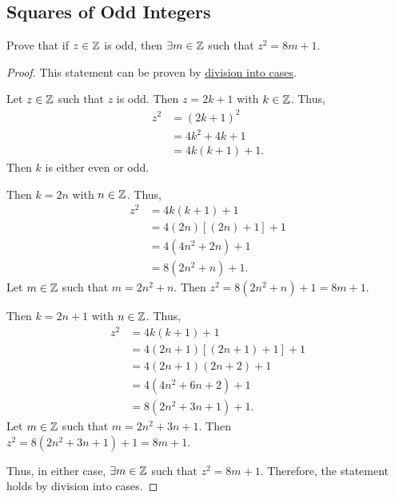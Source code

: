 \subsection{Squares of Odd Integers}
\label{subsections:examples:example1}



\begin{exercise}{
    Prove that if $z \in \mathbb{Z}$ is odd, %
    then $\exists m \in \mathbb{Z}$ such that $z^2 = 8m + 1$.
}
\end{exercise}



\begin{proof}{
    This statement can be proven by %
    \hyperref[subsections:techniques:universal:cases]{division into cases}.

    \begin{panel}[Setup.]{
        Let $z \in \mathbb{Z}$ such that $z$ is odd. %
        Then $z = 2k + 1$ with $k \in \mathbb{Z}$. %
        Thus, %
        \begin{align*}
            z^2 &= (2k + 1)^2\\
                &= 4k^2 + 4k + 1\\
                &= 4k(k + 1) + 1.
        \end{align*}
        Then $k$ is either even or odd.
    }
    \end{panel}

    \begin{panel}{
        Then $k = 2n$ with $n \in \mathbb{Z}$. %
        Thus, %
        \begin{align*}
            z^2 &= 4k(k + 1) + 1\\
                &= 4(2n)[(2n) + 1] + 1\\
                &= 4(4n^2 + 2n) + 1\\
                &= 8(2n^2 + n) + 1.
        \end{align*}
        Let $m \in \mathbb{Z}$ such that $m = 2n^2 + n$. %
        Then $z^2 = 8(2n^2 + n) + 1 = 8m + 1$.
    }
    \end{panel}

    \begin{panel}{
        Then $k = 2n + 1$ with $n \in \mathbb{Z}$. %
        Thus, %
        \begin{align*}
            z^2 &= 4k(k + 1) + 1\\
                &= 4(2n + 1)[(2n + 1) + 1] + 1\\
                &= 4(2n + 1)(2n + 2) + 1\\
                &= 4(4n^2 + 6n + 2) + 1\\
                &= 8(2n^2 + 3n + 1) + 1.
        \end{align*}
        Let $m \in \mathbb{Z}$ such that $m = 2n^2 + 3n + 1$. %
        Then $z^2 = 8(2n^2 + 3n + 1) + 1 = 8m + 1$.
    }
    \end{panel}

    Thus, in either case, $\exists m \in \mathbb{Z}$ such that $z^2 = 8m + 1$. %
    Therefore, the statement holds by division into cases.
}
\end{proof}